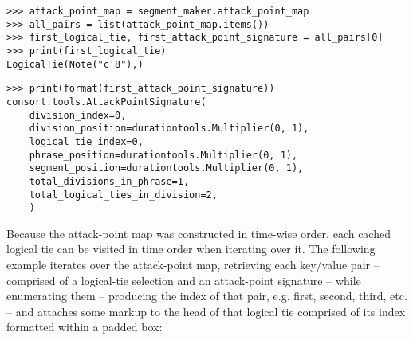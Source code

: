 \begin{comment}
<abjad>[stylesheet=../consort.ily]
attack_point_map = segment_maker.attack_point_map
all_pairs = list(attack_point_map.items())
first_logical_tie, first_attack_point_signature = all_pairs[0]
print(first_logical_tie)
print(format(first_attack_point_signature))
</abjad>
\end{comment}

\begin{abjadbookoutput}
\begin{singlespacing}
\vspace{-0.5\baselineskip}
\begin{lstlisting}
>>> attack_point_map = segment_maker.attack_point_map
>>> all_pairs = list(attack_point_map.items())
>>> first_logical_tie, first_attack_point_signature = all_pairs[0]
>>> print(first_logical_tie)
LogicalTie(Note("c'8"),)
\end{lstlisting}
\begin{lstlisting}
>>> print(format(first_attack_point_signature))
consort.tools.AttackPointSignature(
    division_index=0,
    division_position=durationtools.Multiplier(0, 1),
    logical_tie_index=0,
    phrase_position=durationtools.Multiplier(0, 1),
    segment_position=durationtools.Multiplier(0, 1),
    total_divisions_in_phrase=1,
    total_logical_ties_in_division=2,
    )
\end{lstlisting}
\end{singlespacing}
\end{abjadbookoutput}

\noindent Because the attack-point map was constructed in time-wise order, each
cached logical tie can be visited in time order when iterating over it. The
following example iterates over the attack-point map, retrieving each key/value
pair -- comprised of a logical-tie selection and an attack-point signature --
while enumerating them -- producing the index of that pair, e.g. first, second,
third, etc. -- and attaches some markup to the head of that logical tie
comprised of its index formatted within a padded box:

\begin{comment}
<abjad>[stylesheet=../consort.ily]
for index, key_value_pair in enumerate(attack_point_map.items()):
    logical_tie, attack_point_signature = key_value_pair
    markup = Markup(index, Up)
    markup = markup.smaller().pad_around(0.5).box()
    attach(markup, logical_tie.head)

show(illustration)
</abjad>
\end{comment}

